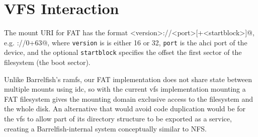 \section{VFS Interaction}

The mount URI for FAT has the format
\verb@fat<version>://<port>[+<startblock>]@, e.g. ://0+63@, where
{\tt version} is is either 16 or 32, {\tt port} is the \acs{ahci} port of the
device, and the optional {\tt startblock} specifies the offset the first sector
of the filesystem (the boot sector).

Unlike Barrelfish's ramfs, our FAT implementation does not share state between
multiple mounts using \acs{idc}, so with the current \acs{vfs} implementation
mounting a FAT filesystem gives the mounting domain exclusive access to the
filesystem and the whole disk. An alternative that would avoid code duplication
would be for the \acs{vfs} to allow part of its directory structure to be
exported as a service, creating a Barrelfish-internal system conceptually
similar to NFS.
